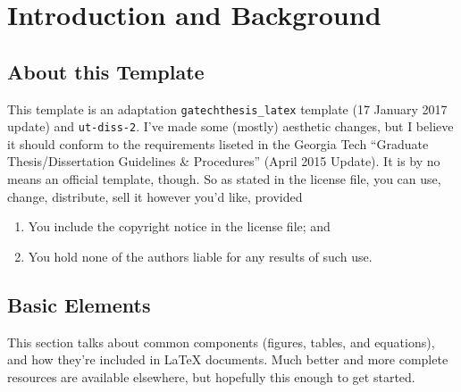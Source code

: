 \chapter{Introduction and Background}

\section{About this Template}
This template is an adaptation \texttt{gatechthesis\_latex} template (17 January 2017 update) and \texttt{ut-diss-2}. 
I've made some (mostly) aesthetic changes, but I believe it should conform to the requirements liseted in the Georgia Tech ``Graduate Thesis/Dissertation Guidelines \& Procedures'' (April 2015 Update).
It is by no means an official template, though. 
So as stated in the license file, you can use, change, distribute, sell it however you'd like, provided
\begin{enumerate}
  \item You include the copyright notice in the license file; and
  \item You hold none of the authors liable for any results of such use.
\end{enumerate}

\section{Basic Elements}
This section talks about common components (figures, tables, and equations), and how they're included in \LaTeX{} documents.
Much better and more complete resources are available elsewhere, but hopefully this enough to get started.


